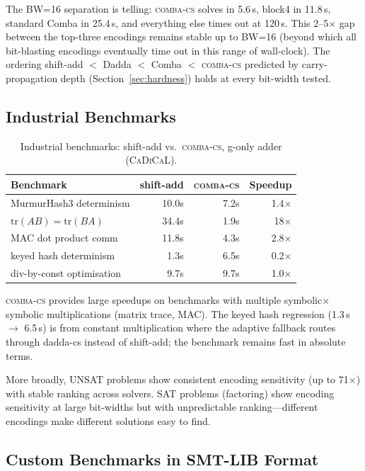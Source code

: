 \documentclass[a4paper]{ceurart}
\newcommand{\combacs}{\textsc{comba-cs}\xspace}
\newcommand{\cadical}{\textsc{CaDiCaL}\xspace}
\begin{document}
The BW=16 separation is telling: \combacs solves in 5.6\,s,
block4 in 11.8\,s, standard Comba in 25.4\,s, and everything
else times out at 120\,s. This 2--5$\times$ gap between the
top-three encodings remains stable up to BW=16 (beyond which
all bit-blasting encodings eventually time out in this range of
wall-clock). The ordering shift-add $<$ Dadda $<$ Comba $<$
\combacs predicted by carry-propagation depth
(Section~\ref{sec:hardness}) holds at every bit-width tested.

\subsection{Industrial Benchmarks}

\begin{table}[ht]
\caption{Industrial benchmarks: shift-add vs.\ \combacs, g-only adder
  (\cadical).}
\label{tab:industrial}
\centering
\begin{tabular}{lrrr}
\toprule
Benchmark & shift-add & \combacs & Speedup \\
\midrule
MurmurHash3 determinism & 10.0s & 7.2s & 1.4$\times$ \\
$\mathrm{tr}(AB) = \mathrm{tr}(BA)$ & 34.4s & 1.9s & 18$\times$ \\
MAC dot product comm    & 11.8s & 4.3s & 2.8$\times$ \\
keyed hash determinism  & 1.3s & 6.5s & 0.2$\times$ \\
div-by-const optimisation & 9.7s & 9.7s & 1.0$\times$ \\
\bottomrule
\end{tabular}
\end{table}

\combacs provides large speedups on benchmarks with multiple
symbolic$\times$symbolic multiplications (matrix trace, MAC).
The keyed hash regression (1.3\,s $\to$ 6.5\,s) is from constant
multiplication where the adaptive fallback routes through dadda-cs
instead of shift-add; the benchmark remains fast in absolute terms.

More broadly, UNSAT problems show consistent encoding sensitivity (up
to 71$\times$) with stable ranking across solvers. SAT problems
(factoring) show encoding sensitivity at large bit-widths but with
unpredictable ranking---different encodings make different solutions
easy to find.

\subsection{Custom Benchmarks in SMT-LIB Format}
\label{sec:custom}
\end{document}
